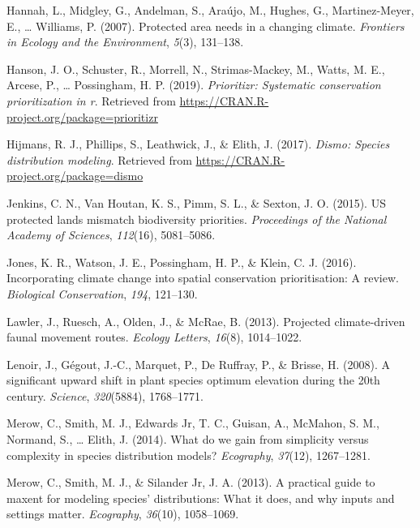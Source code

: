\documentclass[]{article}
\begin{document}
\leavevmode\hypertarget{ref-hannah2007protected}{}%
Hannah, L., Midgley, G., Andelman, S., Araújo, M., Hughes, G., Martinez-Meyer, E., \ldots{} Williams, P. (2007). Protected area needs in a changing climate. \emph{Frontiers in Ecology and the Environment}, \emph{5}(3), 131--138.

\leavevmode\hypertarget{ref-Hanson2019}{}%
Hanson, J. O., Schuster, R., Morrell, N., Strimas-Mackey, M., Watts, M. E., Arcese, P., \ldots{} Possingham, H. P. (2019). \emph{Prioritizr: Systematic conservation prioritization in r}. Retrieved from \url{https://CRAN.R-project.org/package=prioritizr}

\leavevmode\hypertarget{ref-Hijmans_Dismo}{}%
Hijmans, R. J., Phillips, S., Leathwick, J., \& Elith, J. (2017). \emph{Dismo: Species distribution modeling}. Retrieved from \url{https://CRAN.R-project.org/package=dismo}

\leavevmode\hypertarget{ref-jenkins2015us}{}%
Jenkins, C. N., Van Houtan, K. S., Pimm, S. L., \& Sexton, J. O. (2015). US protected lands mismatch biodiversity priorities. \emph{Proceedings of the National Academy of Sciences}, \emph{112}(16), 5081--5086.

\leavevmode\hypertarget{ref-jones2016incorporating}{}%
Jones, K. R., Watson, J. E., Possingham, H. P., \& Klein, C. J. (2016). Incorporating climate change into spatial conservation prioritisation: A review. \emph{Biological Conservation}, \emph{194}, 121--130.

\leavevmode\hypertarget{ref-lawler2013projected}{}%
Lawler, J., Ruesch, A., Olden, J., \& McRae, B. (2013). Projected climate-driven faunal movement routes. \emph{Ecology Letters}, \emph{16}(8), 1014--1022.

\leavevmode\hypertarget{ref-lenoir2008significant}{}%
Lenoir, J., Gégout, J.-C., Marquet, P., De Ruffray, P., \& Brisse, H. (2008). A significant upward shift in plant species optimum elevation during the 20th century. \emph{Science}, \emph{320}(5884), 1768--1771.

\leavevmode\hypertarget{ref-merow2014we}{}%
Merow, C., Smith, M. J., Edwards Jr, T. C., Guisan, A., McMahon, S. M., Normand, S., \ldots{} Elith, J. (2014). What do we gain from simplicity versus complexity in species distribution models? \emph{Ecography}, \emph{37}(12), 1267--1281.

\leavevmode\hypertarget{ref-merow2013practical}{}%
Merow, C., Smith, M. J., \& Silander Jr, J. A. (2013). A practical guide to maxent for modeling species' distributions: What it does, and why inputs and settings matter. \emph{Ecography}, \emph{36}(10), 1058--1069.
\end{document}
